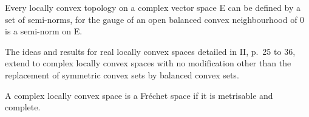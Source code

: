 Every locally convex topology on a complex vector space E can be defined by a set of semi-norms, for the gauge of an open balanced convex neighbourhood of 0 is a semi-norm on E.

The ideas and results for real locally convex spaces detailed in II, p.~25 to 36, extend to complex locally convex spaces with no modification other than the replacement of symmetric convex sets by balanced convex sets.

A complex locally convex space is a Fréchet space if it is metrisable and complete.

